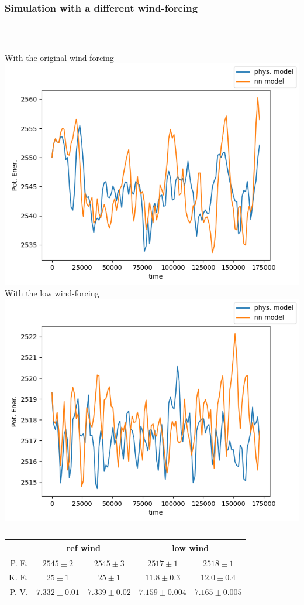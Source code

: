 \documentclass[handout]{beamer}
\begin{document}
\begin{frame}
\frametitle{Simulation with a different wind-forcing}
~\\
\begin{columns}
\centering
With the original wind-forcing
\includegraphics[width=\textwidth]{./fig/L3/Ep_std.png}\\
\centering
With the low wind-forcing
\includegraphics[width=\textwidth]{./fig/L3/Ep_windlow.png}\\
\end{columns}
\pause
\begin{table}
\footnotesize
\begin{tabular}{|r|c|c|c|c|}
\hline
& \multicolumn{2}{c|}{ref wind} & \multicolumn{2}{c|}{low wind} \\
\hline
P. E.  &$ 2545 \pm 2$ & $2545 \pm3$  &  $ 2517 \pm 1$ & $2518 \pm1$\\
K. E. & $25 \pm 1$& $25 \pm 1$ &$11.8 \pm 0.3$ & $12.0 \pm 0.4$\\
P. V. & $7.332 \pm 0.01$   & $7.339 \pm 0.02$ & $7.159 \pm 0.004 $ & $7.165 \pm 0.005 $ \\
\hline
\end{tabular}
\end{table}
\end{frame}

\begin{frame}{}
   
\end{frame}
    
\end{document}
